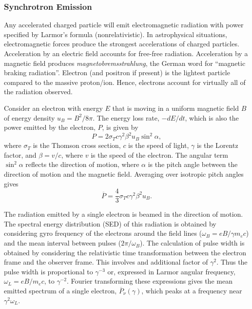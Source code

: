 \subsubsection{Synchrotron Emission}

Any accelerated charged particle will emit electromagnetic radiation with power specified by Larmor's formula (nonrelativistic). In astrophysical situations, electromagnetic forces produce the strongest accelerations of charged particles. Acceleration by an electric field accounts for free-free radiation. Acceleration by a magnetic field produces \textit{magnetobremsstrahlung}, the German word for ``magnetic braking radiation''. Electron (and positron if present) is the lightest particle compared to the massive proton/ion. Hence, electrons account for virtually all of the radiation observed.

Consider an electron with energy $E$ that is moving in a uniform magnetic field $B$ of energy density $u_B = B^2/8\pi$. The energy loss rate, $-dE/dt$, which is also the power emitted by the electron, $P$, is given by
\begin{equation}
P = 2 \sigma_T c \gamma^2 \beta^2 u_B \sin^2{\alpha},
\end{equation}
where $\sigma_T$ is the Thomson cross section, $c$ is the speed of light, $\gamma$ is the Lorentz factor, and $\beta = v/c$, where $v$ is the speed of the electron. The angular term $\sin^2{\alpha}$ reflects the direction of motion, where $\alpha$ is the pitch angle between the direction of motion and the magnetic field. Averaging over isotropic pitch angles gives
\begin{equation}
\overline{P} = \frac{4}{3} \sigma_T c \gamma^2 \beta^2 u_B.
\end{equation}

The radiation emitted by a single electron is beamed in the direction of motion. The spectral energy distribution (SED) of this radiation is obtained by considering gyro frequency of the electrons around the field lines ($\omega_B = e B / \gamma m_e c$) and the mean interval between pulses ($2 \pi / \omega_B$). The calculation of pulse width is obtained by considering the relativistic time transformation between the electron frame and the observer frame. This involves and additional factor of $\gamma^2$. Thus the pulse width is proportional to $\gamma^{-3}$ or, expressed in Larmor angular frequency, $\omega_L = e B/ m_e c$, to $\gamma^{-2}$. Fourier transforming these expressions gives the mean emitted spectrum of a single electron, $\overline{P}_{\nu}(\gamma)$, which peaks at a frequency near $\gamma^2 \omega_L$.

